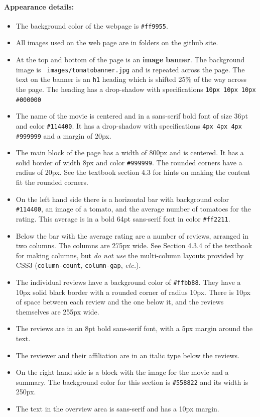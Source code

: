 \documentclass{article}
\begin{document}
\paragraph{Appearance details:}
\begin{itemize}
\item The background color of the webpage is \verb|#ff9955|.
  \item
All images used on the web page are in folders on the github site.
\item
At the top and bottom of the page is an {\bf image banner}.
 The background image is {\tt
   images/tomatobanner.jpg} and is repeated across the page.
 The text
on the banner is an {\tt h1} heading which is shifted 25\% of the way
across the page.  The heading has a drop-shadow with specifications
\verb|10px 10px 10px #000000|
\item
The name of the movie is centered and in a sans-serif bold font
of size 36pt and color \verb|#114400|.  It has a drop-shadow with
specifications \verb|4px 4px 4px #999999| and a margin of 20px.
\item
The main block of the page has a width of 800px and is centered.
It has a solid border of width 8px and color \verb|#999999|.  The
rounded corners have a radius of 20px.  See the textbook section 4.3
for hints on making the content fit the rounded corners.
\item
On the left hand side there is a horizontal bar with background color
\verb|#114400|, an image of a tomato, and the average number of
tomatoes for the rating.  This average is in a bold 64pt sans-serif
font in color \verb|#ff2211|.
\item
Below the bar with the average rating are a number of reviews,
arranged in two columns.
The columns are 275px wide. See Section 4.3.4 of the textbook for making
columns, but {\em do not use} the multi-column layouts provided by
CSS3 ({\tt column-count}, {\tt column-gap}, {\em etc.}).  
\item
The individual reviews have a background color of \verb|#ffbb88|.
They have a 10px solid black border with a rounded corner of radius
10px. There is 10px of space between each review and the one below it,
and the reviews themselves are 255px wide.
\item
The reviews are in an 8pt bold sans-serif font, with a 5px margin
around the text.
\item
The reviewer and their affiliation are in an italic type below the
reviews. 
\item
On the right hand side is a block with the image for the movie and a
summary.  The background color for this section is \verb|#558822| and
its width is 250px.
\item
The text in the overview area is sans-serif and has a 10px margin.
\end{itemize}
\end{document}
